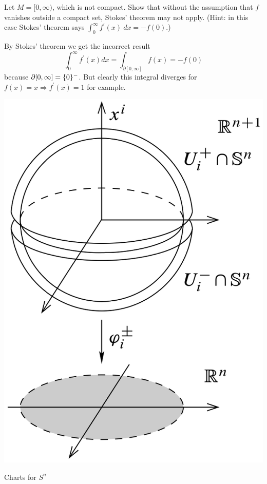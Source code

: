 \documentclass[10pt]{article}
\begin{document}
\begin{example}
	Let $M = [0,\infty)$, which is not compact. Show that without the assumption that $f$ vanishes outside a compact set, Stokes' theorem may not apply. (Hint: in this case Stokes' theorem says $\int_{0}^{\infty} f^\prime(x)\:dx = - f(0)$.)
\end{example}
\sol By Stokes' theorem we get the incorrect result
$$
\int_{0}^{\infty} f^\prime(x)dx = \int_{\partial[0, \infty]} f(x) = - f(0)
$$
because $\partial[0, \infty] = \lbrace0\rbrace^-$. But clearly this integral diverges for $f(x)=x\Rightarrow f^\prime(x) = 1$ for example.
\begin{marginfigure}
	\begin{center}
		\includegraphics[width=1.2\textwidth]{figs/sn.png}
	\end{center}
	\caption{Charts for $S^n$}
\end{marginfigure} 
\end{document}
